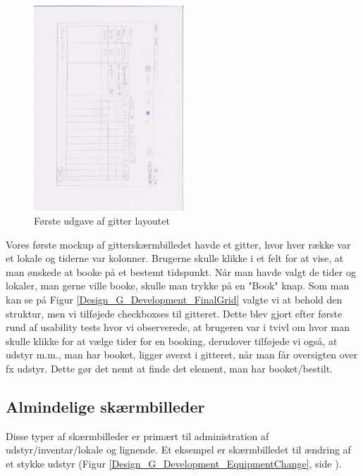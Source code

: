 \begin{figure}[h!]
  \centering
    \includegraphics[width=0.5\textwidth, angle=90]{Appendix/GUI-Prototype/PaperMockup/LokaleListe_001}
  \caption{Første udgave af gitter layoutet}
\label{Design_G_Development_FirstGrid}
\end{figure}

Vores første mockup af gitterskærmbilledet havde et gitter, hvor hver række var et lokale og tiderne var kolonner. Brugerne skulle klikke i et felt for at vise, at man ønskede at booke på et bestemt tidspunkt. Når man havde valgt de tider og lokaler, man gerne ville booke, skulle man trykke på en "Book" knap. Som man kan se på Figur \ref{Design_G_Development_FinalGrid} valgte vi at behold den struktur, men vi tilføjede checkboxses til gitteret. Dette blev gjort efter første rund af usability tests hvor vi observerede, at brugeren var i tvivl om hvor man skulle klikke for at vælge tider for en booking, derudover tilføjede vi også, at udstyr m.m., man har booket, ligger øverst i gitteret, når man får oversigten over fx udstyr. Dette gør det nemt at finde det element, man har booket/bestilt.


\subsection{Almindelige skærmbilleder}
\label{Design_G_Development_NormalWindows}
Disse typer af skærmbilleder er primært til administration af udstyr/inventar/lokale og lignende. Et eksempel er skærmbilledet til ændring af et stykke udstyr (Figur \ref{Design_G_Development_EquipmentChange}, side \pageref{Design_G_Development_EquipmentChange}). 

